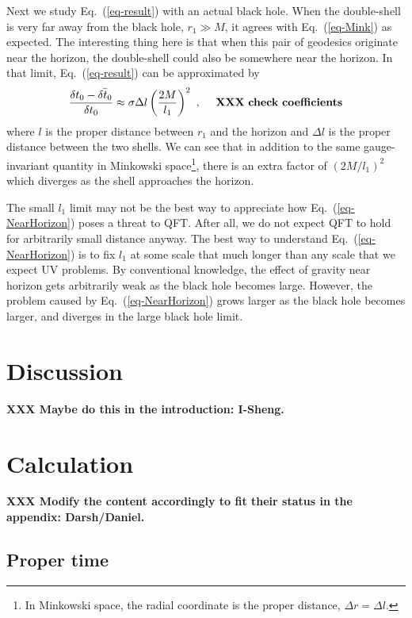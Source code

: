 \documentclass[aps,showpacs,twocolumn,floats,prd,superscriptaddress,nofootinbib]{revtex4-1}
\begin{document}
Next we study Eq.~(\ref{eq-result}) with an actual black hole. When the double-shell is very far away from the black hole, $r_1\gg M$, it agrees with Eq.~(\ref{eq-Mink}) as expected. The interesting thing here is that when this pair of geodesics originate near the horizon, the double-shell could also be somewhere near the horizon. In that limit, Eq.~(\ref{eq-result}) can be approximated by
\begin{equation}
\frac{\delta t_0 - \bar{\delta t_0}}{\delta t_0} \approx
\sigma \Delta l \left(\frac{2M}{l_1}\right)^2~, \ \ \ \ {\rm \bf XXX \ check \ coefficients}
\label{eq-NearHorizon}
\end{equation}
where $l$ is the proper distance between $r_1$ and the horizon and $\Delta l$ is the proper distance between the two shells. We can see that in addition to the same gauge-invariant quantity in Minkowski space\footnote{In Minkowski space, the radial coordinate is the proper distance, $\Delta r=\Delta l$.}, there is an extra factor of $(2M/l_1)^2$ which diverges as the shell approaches the horizon.

The small $l_1$ limit may not be the best way to appreciate how Eq.~(\ref{eq-NearHorizon}) poses a threat to QFT. After all, we do not expect QFT to hold for arbitrarily small distance anyway. The best way to understand Eq.~(\ref{eq-NearHorizon}) is to fix $l_1$ at some scale that much longer than any scale that we expect UV problems. By conventional knowledge, the effect of gravity near horizon gets arbitrarily weak as the black hole becomes large. However, the problem caused by Eq.~(\ref{eq-NearHorizon}) grows larger as the black hole becomes larger, and diverges in the large black hole limit.


\section{Discussion}

{\bf XXX Maybe do this in the introduction: I-Sheng.}

\appendix


\section{Calculation}

{\bf XXX Modify the content accordingly to fit their status in the appendix: Darsh/Daniel.}

\subsection{Proper time}
\end{document}
